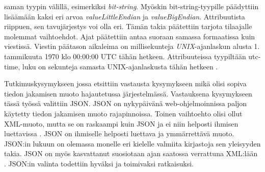 saman tyypin välillä, esimerkiksi \emph{bit-string}. Myöskin bit-string-tyypille päädyttiin lisäämään kaksi eri arvoa \emph{valueLittleEndian} ja \emph{valueBigEndian}. Attribuutista riippuen, sen tavujärjestys voi olla eri. Tämän takia päätettiin tarjota tilaajalle molemmat vaihtoehdot. Ajat päätettiin antaa suoraan samassa formaatissa kuin viestissä. Viestin päätason aikaleima on millisekunteja \emph{UNIX}-ajanlaskun alusta 1. tammikuuta 1970 klo 00:00:00 UTC tähän hetkeen. Attribuuteissa tyypiltään utc-time, luku on sekunteja samasta UNIX-ajanlaskusta tähän hetkeen \mbox{\cite[s.~26--27]{IEC61850-7-2}}.

Tutkimuskysymykseen jossa etsittiin vastausta kysymykseen mikä olisi sopiva tiedon jakamisen muoto hajautetussa järjestelmässä. Vastauksena kysymykseen tässä työssä valittiin JSON. JSON on nykypäivänä web-ohjelmoinnissa paljon käytetty tiedon jakamisen muoto rajapinnoissa. Toinen vaihtoehto olisi ollut XML-muoto, mutta se on raskaampi kuin JSON ja ei niin helposti ihmisen luettavissa \cite[s.~159]{distributed-systems-concepts-and-design}. JSON on ihmiselle helposti luettava ja ymmärrettävä muoto. JSON:in lukuun on olemassa monelle eri kielelle valmiita kirjastoja sen yleisyyden takia. JSON on myös kasvattanut suosiotaan ajan saatossa verrattuna XML:lään \cite{google-trends-xml-json}. JSON:in valinta todettiin hyväksi ja toimivaksi ratkaisuksi. \cite{the-rise-and-rise-of-json, why-json-is-better-than-xml}